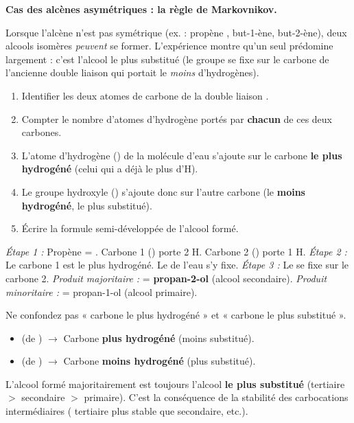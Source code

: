\documentclass[11pt]{article}
\begin{document}
\textbf{Cas des alcènes asymétriques : la règle de Markovnikov.}\par
Lorsque l'alcène n'est pas symétrique (ex. : propène , but-1-ène, but-2-ène), deux alcools isomères \emph{peuvent} se former. L'expérience montre qu'un seul prédomine largement : c'est l'alcool le plus substitué (le groupe  se fixe sur le carbone de l'ancienne double liaison qui portait le \emph{moins} d'hydrogènes).

\begin{methode}
\begin{enumerate}
\item Identifier les deux atomes de carbone de la double liaison .
\item Compter le nombre d'atomes d'hydrogène portés par \textbf{chacun} de ces deux carbones.
\item L'atome d'hydrogène () de la molécule d'eau s'ajoute sur le carbone \textbf{le plus hydrogéné} (celui qui a déjà le plus d'H).
\item Le groupe hydroxyle () s'ajoute donc sur l'autre carbone (le \textbf{moins hydrogéné}, le plus substitué).
\item Écrire la formule semi-développée de l'alcool formé.
\end{enumerate}
\end{methode}

\begin{exemplebox}
\emph{Étape 1 :} Propène = . Carbone 1 () porte 2 H. Carbone 2 () porte 1 H.
\emph{Étape 2 :} Le carbone 1 est le plus hydrogéné. Le  de l'eau s'y fixe.
\emph{Étape 3 :} Le  se fixe sur le carbone 2.
\emph{Produit majoritaire :}  = \textbf{propan-2-ol} (alcool secondaire).
\emph{Produit minoritaire :}  = propan-1-ol (alcool primaire).
\end{exemplebox}

\begin{attention}
Ne confondez pas « carbone le plus hydrogéné » et « carbone le plus substitué ».
\begin{itemize}
\item {} (de ) $\to$ Carbone \textbf{plus hydrogéné} (moins substitué).
\item {} (de ) $\to$ Carbone \textbf{moins hydrogéné} (plus substitué).
\end{itemize}
L'alcool formé majoritairement est toujours l'alcool \textbf{le plus substitué} (tertiaire $>$ secondaire $>$ primaire). C'est la conséquence de la stabilité des carbocations intermédiaires ( tertiaire plus stable que secondaire, etc.).
\end{attention}
\end{document}
